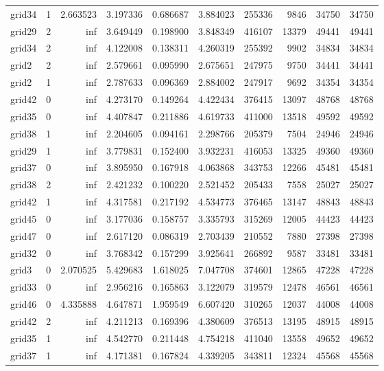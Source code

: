 \begin{longtable}{|l|r|r|r|r|r|r|r|r|r|}
grid34 & 1 & 2.663523 & 3.197336 & 0.686687 & 3.884023 & 255336 & 9846 & 34750 & 34750 \\
grid29 & 2 & inf & 3.649449 & 0.198900 & 3.848349 & 416107 & 13379 & 49441 & 49441 \\
grid34 & 2 & inf & 4.122008 & 0.138311 & 4.260319 & 255392 & 9902 & 34834 & 34834 \\
grid2 & 2 & inf & 2.579661 & 0.095990 & 2.675651 & 247975 & 9750 & 34441 & 34441 \\
grid2 & 1 & inf & 2.787633 & 0.096369 & 2.884002 & 247917 & 9692 & 34354 & 34354 \\
grid42 & 0 & inf & 4.273170 & 0.149264 & 4.422434 & 376415 & 13097 & 48768 & 48768 \\
grid35 & 0 & inf & 4.407847 & 0.211886 & 4.619733 & 411000 & 13518 & 49592 & 49592 \\
grid38 & 1 & inf & 2.204605 & 0.094161 & 2.298766 & 205379 & 7504 & 24946 & 24946 \\
grid29 & 1 & inf & 3.779831 & 0.152400 & 3.932231 & 416053 & 13325 & 49360 & 49360 \\
grid37 & 0 & inf & 3.895950 & 0.167918 & 4.063868 & 343753 & 12266 & 45481 & 45481 \\
grid38 & 2 & inf & 2.421232 & 0.100220 & 2.521452 & 205433 & 7558 & 25027 & 25027 \\
grid42 & 1 & inf & 4.317581 & 0.217192 & 4.534773 & 376465 & 13147 & 48843 & 48843 \\
grid45 & 0 & inf & 3.177036 & 0.158757 & 3.335793 & 315269 & 12005 & 44423 & 44423 \\
grid47 & 0 & inf & 2.617120 & 0.086319 & 2.703439 & 210552 & 7880 & 27398 & 27398 \\
grid32 & 0 & inf & 3.768342 & 0.157299 & 3.925641 & 266892 & 9587 & 33481 & 33481 \\
grid3 & 0 & 2.070525 & 5.429683 & 1.618025 & 7.047708 & 374601 & 12865 & 47228 & 47228 \\
grid33 & 0 & inf & 2.956216 & 0.165863 & 3.122079 & 319579 & 12478 & 46561 & 46561 \\
grid46 & 0 & 4.335888 & 4.647871 & 1.959549 & 6.607420 & 310265 & 12037 & 44008 & 44008 \\
grid42 & 2 & inf & 4.211213 & 0.169396 & 4.380609 & 376513 & 13195 & 48915 & 48915 \\
grid35 & 1 & inf & 4.542770 & 0.211448 & 4.754218 & 411040 & 13558 & 49652 & 49652 \\
grid37 & 1 & inf & 4.171381 & 0.167824 & 4.339205 & 343811 & 12324 & 45568 & 45568 \\

\end{longtable}
